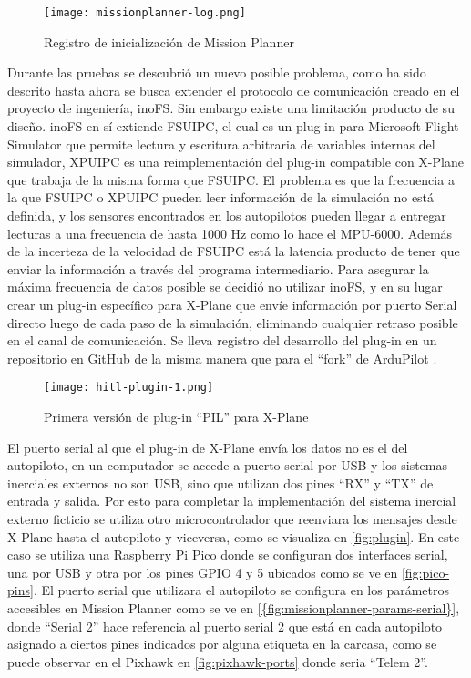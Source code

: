 \begin{figure}[h]
    \centering
    \texttt{[image: missionplanner-log.png]}
    \caption{Registro de inicialización de Mission Planner}
    \label{fig:missionplanner-log}
\end{figure}

Durante las pruebas se descubrió un nuevo posible problema, como ha sido descrito hasta ahora se busca extender el protocolo de comunicación creado en el proyecto de ingeniería, inoFS. Sin embargo existe una limitación producto de su diseño. inoFS en sí extiende FSUIPC, el cual es un plug-in para Microsoft Flight Simulator que permite lectura y escritura arbitraria de variables internas del simulador, XPUIPC es una reimplementación del plug-in compatible con X-Plane que trabaja de la misma forma que FSUIPC. El problema es que la frecuencia a la que FSUIPC o XPUIPC pueden leer información de la simulación no está definida, y los sensores encontrados en los autopilotos pueden llegar a entregar lecturas a una frecuencia de hasta 1000 Hz como lo hace el MPU-6000. Además de la incerteza de la velocidad de FSUIPC está la latencia producto de tener que enviar la información a través del programa intermediario. Para asegurar la máxima frecuencia de datos posible se decidió no utilizar inoFS, y en su lugar crear un plug-in específico para X-Plane que envíe información por puerto Serial directo luego de cada paso de la simulación, eliminando cualquier retraso posible en el canal de comunicación. Se lleva registro del desarrollo del plug-in en un repositorio en GitHub de la misma manera que para el ``fork'' de ArduPilot \cite{xplane-hitl-plugin}.

\begin{figure}[h]
    \centering
    \texttt{[image: hitl-plugin-1.png]}
    \caption{Primera versión de plug-in ``PIL'' para X-Plane}
    \label{fig:hitl-plugin-1}
\end{figure}

El puerto serial al que el plug-in de X-Plane envía los datos no es el del autopiloto, en un computador se accede a puerto serial por USB y los sistemas inerciales externos no son USB, sino que utilizan dos pines ``RX'' y ``TX'' de entrada y salida. Por esto para completar la implementación del sistema inercial externo ficticio se utiliza otro microcontrolador que reenviara los mensajes desde X-Plane hasta el autopiloto y viceversa, como se visualiza en \cref{fig:plugin}. En este caso se utiliza una Raspberry Pi Pico donde se configuran dos interfaces serial, una por USB y otra por los pines GPIO 4 y 5 ubicados como se ve en \cref{fig:pico-pins}. El puerto serial que utilizara el autopiloto se configura en los parámetros accesibles en Mission Planner como se ve en \cref{{fig:missionplanner-params-serial}}, donde ``Serial 2'' hace referencia al puerto serial 2 que está en cada autopiloto asignado a ciertos pines indicados por alguna etiqueta en la carcasa, como se puede observar en el Pixhawk en \cref{fig:pixhawk-ports} donde seria ``Telem 2''.

